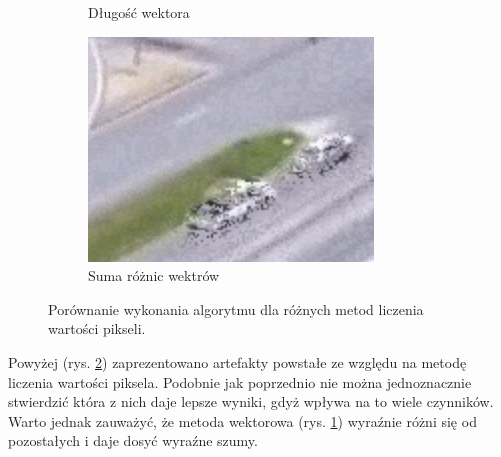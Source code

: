 \begin{figure}[H]
\begin{subfigure}{.333\textwidth}
  \caption{Długość wektora}
\end{subfigure}%
\begin{subfigure}{.333\textwidth}
  \centering
  \includegraphics[width=.95\linewidth]{img/vec-art.png}
  \caption{Suma różnic wektrów}
  \label{fig:vec}
\end{subfigure}%
\caption{Porównanie wykonania algorytmu dla różnych metod liczenia wartości pikseli.}
\label{fig:value}
\end{figure}

Powyżej (rys. \ref{fig:value}) zaprezentowano artefakty powstałe ze względu na metodę liczenia wartości piksela. Podobnie jak poprzednio nie można jednoznacznie stwierdzić która z nich daje lepsze wyniki, gdyż wpływa na to wiele czynników. Warto jednak zauważyć, że metoda wektorowa (rys. \ref{fig:vec}) wyraźnie różni się od pozostałych i daje dosyć wyraźne szumy.